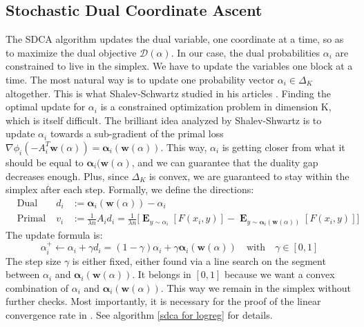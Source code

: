 \documentclass{article}
\DeclareMathOperator{\1}{\mathbb{1}}
\DeclareMathOperator{\E}{\mathbf{E}}
\begin{document}
\subsection{Stochastic Dual Coordinate Ascent}
The SDCA algorithm updates the dual variable, one coordinate at a time, so as to maximize the dual objective $\mathscr D(\alpha)$.
In our case, the dual probabilities $\alpha_i$ are constrained to live in the simplex.
We have to update the variables one block at a time.
The most natural way is to update one probability vector $\alpha_i \in \Delta_K$ altogether.
This is what Shalev-Schwartz studied in his articles \cite{shalev-shwartz_accelerated_2013-1}.
Finding the optimal update for $\alpha_i$ is a constrained optimization problem in dimension K, which is itself difficult. 
The brilliant idea analyzed by Shalev-Shwartz is to update $\alpha_i$ towards a sub-gradient of the primal loss $\nabla\phi_i( - A_i^T\bm w(\alpha)) = \bm \alpha_i(\bm w(\alpha))$.
This way, $\alpha_i$ is getting closer from what it should be equal to $\bm \alpha_i(\bm w(\alpha)$, and we can guarantee that the duality gap decreases enough.
Plus, since $\Delta_K$ is convex, we are guaranteed to stay within the simplex after each step.  
Formally, we define the directions:
\begin{align*}
	& \textrm{Dual ascent:} &  d_i &:= \bm \alpha_i(\bm w(\alpha)) - \alpha_i \\
	&\textrm{Primal descent} &  v_i &:= \frac{1}{\lambda n} A_i d_i  = \frac{1}{\lambda n} \big [ \E_{y \sim \alpha_i} [F(x_i, y)] - \E_{y \sim  \bm \alpha_i(\bm w(\alpha)) } [F(x_i, y)] \big ]
\end{align*} 
The update formula is:
\begin{equation*}
	\alpha_i^+ \leftarrow \alpha_i + \gamma d_i = (1-\gamma)\alpha_i + \gamma \bm \alpha_i(\bm w(\alpha)) \quad \textrm{with} \quad \gamma \in [0,1]
\end{equation*}
The step size $\gamma$ is either fixed, either found via a line search on the segment between $\alpha_i$ and $\bm \alpha_i(\bm w(\alpha))$. 
It belongs in $[0,1]$ because we want a convex combination of $\alpha_i$ and $\bm \alpha_i(\bm w(\alpha))$.
This way we remain in the simplex without further checks. 
Most importantly, it is necessary for the proof of the linear convergence rate in \cite{shalev-shwartz_accelerated_2013-1}. 
See algorithm \ref{sdca for logreg} for details.
\end{document}
